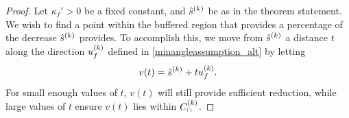 \begin{proof}

Let $\kappa_f' > 0$ be a fixed constant, and ${{\hat s}^{(k)}}$ be as in the theorem statement.
We wish to find a point within the buffered region that provides a percentage of the decrease ${{\hat s}^{(k)}} $ provides.
To accomplish this, we move from ${{\hat s}^{(k)}} $ a distance $t$ along the direction ${u^{(k)}_f}$ defined in \cref{minangleassumption_alt} by letting 
\begin{align*}
v(t) = {{\hat s}^{(k)}}  + t {u^{(k)}_f}.
\end{align*}
For small enough values of $t$, $v(t)$ will still provide sufficient reduction,
while large values of $t$ ensure $v(t)$ lies within ${C^{(k)}_{\cap}}$.


\end{proof}
